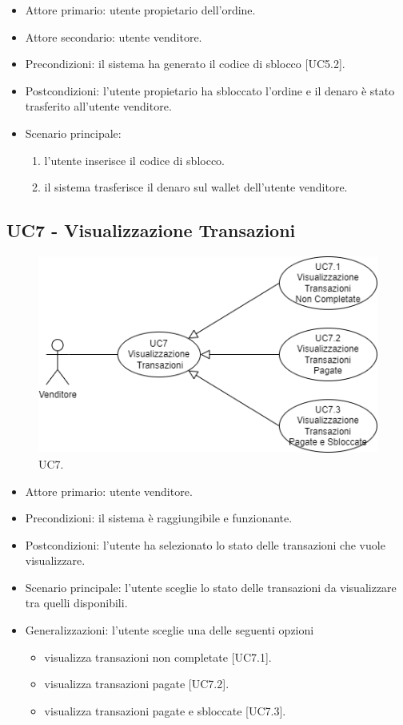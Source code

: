 \begin{itemize}
    \item Attore primario: utente propietario dell'ordine.
    \item Attore secondario: utente venditore.
    \item Precondizioni: il sistema ha generato il codice di sblocco [UC5.2]. 
    \item Postcondizioni: l'utente propietario ha sbloccato l'ordine e il denaro è stato trasferito all'utente venditore.
    \item Scenario principale: \begin{enumerate}
        \item l'utente inserisce il codice di sblocco.
        \item il sistema trasferisce il denaro sul wallet dell'utente venditore.
    \end{enumerate}
\end{itemize}

\subsection{UC7 - Visualizzazione Transazioni}

\begin{figure}[H]
    \centering
    \includegraphics[scale=0.7]{immagini/UseCases-UC7.png}
    \caption{UC7.}
  \end{figure}

\begin{itemize}
    \item Attore primario: utente venditore.
    \item Precondizioni: il sistema è raggiungibile e funzionante.
    \item Postcondizioni: l'utente ha selezionato lo stato delle transazioni che vuole visualizzare.
    \item Scenario principale: l'utente sceglie lo stato delle transazioni da visualizzare tra quelli disponibili.
    \item Generalizzazioni: l'utente sceglie una delle seguenti opzioni\begin{itemize}
        \item visualizza transazioni non completate [UC7.1].
        \item visualizza transazioni pagate [UC7.2].
        \item visualizza transazioni pagate e sbloccate [UC7.3].
    \end{itemize}
\end{itemize}

